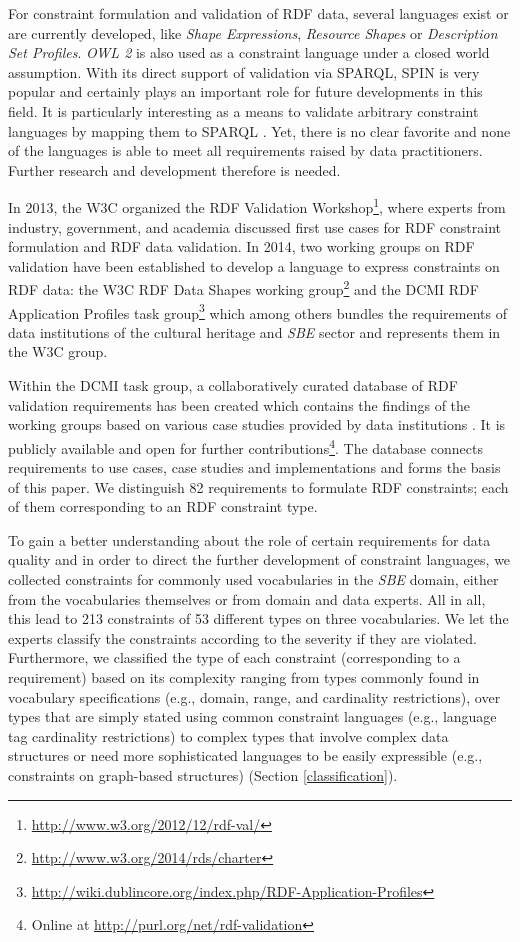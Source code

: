 \documentclass[conference]{IEEEtran}
\begin{document}
For constraint formulation and validation of RDF data, several languages exist or are currently developed, like \emph{Shape Expressions}, \emph{Resource Shapes} or \emph{Description Set Profiles}. \emph{OWL 2} is also used as a constraint language under a closed world assumption. With its direct support of validation via SPARQL, SPIN%
is very popular and certainly plays an important role for future developments in this field. It is particularly interesting as a means to validate arbitrary constraint languages by mapping them to SPARQL \cite{BoschEckert2014-2}. Yet, there is no clear favorite and none of the languages is able to meet all requirements raised by data practitioners. Further research and development therefore is needed.

In 2013, the W3C organized the RDF Validation Workshop\footnote{\url{http://www.w3.org/2012/12/rdf-val/}}, 
where experts from industry, government, and academia discussed first use cases for RDF constraint formulation and RDF data validation.
In 2014, two working groups on RDF validation have been established to develop a language to express constraints on RDF data: 
the W3C RDF Data Shapes working group\footnote{\url{http://www.w3.org/2014/rds/charter}} and the DCMI RDF Application Profiles task group\footnote{\url{http://wiki.dublincore.org/index.php/RDF-Application-Profiles}} which among others bundles the requirements of data institutions of the cultural heritage and \emph{SBE} sector and represents them in the W3C group. 

Within the DCMI task group, a collaboratively curated database of RDF validation requirements has been created which contains the findings of the working groups based on various case studies provided by data institutions \cite{BoschEckert2014}. It is publicly available and open for further contributions\footnote{Online at \url{http://purl.org/net/rdf-validation}}.
The database connects requirements to use cases, case studies and implementations and forms the basis of this paper. 
We distinguish 82 requirements to formulate RDF constraints; 
each of them corresponding to an RDF constraint type.

To gain a better understanding about the role of certain requirements for data quality and in order to direct the further development of constraint languages, we collected constraints for commonly used vocabularies in the \emph{SBE} domain, either from the vocabularies themselves or from domain and data experts. All in all, this lead to 213 constraints of 53 different types on three vocabularies. 
We let the experts classify the constraints according to the severity if they are violated. Furthermore, we classified the type of each constraint (corresponding to a requirement) based on its complexity ranging from types commonly found in vocabulary specifications (e.g., domain, range, and cardinality restrictions), 
over types that are simply stated using common constraint languages (e.g., language tag cardinality restrictions) to complex types that involve complex data structures or need more sophisticated languages to be easily expressible 
(e.g., constraints on graph-based structures) (Section \ref{classification}).
\end{document}
